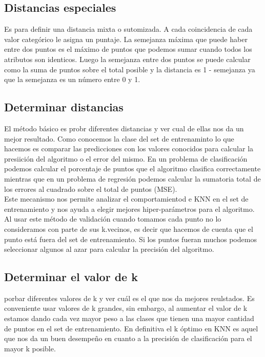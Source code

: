 \documentclass[titlepage,a4paper]{article}
\begin{document}
\subsection*{Distancias especiales}
Es para definir una distancia mixta o sutomizada. A cada coincidencia de cada valor categórico le asigna un puntaje. La semejanza máxima que puede haber entre dos puntos es el máximo de puntos que podemos sumar cuando todos los atributos son identicos. Luego la semejanza entre dos puntos se puede calcular como la suma de puntos sobre el total posible y la distancia es 1 - semejanza ya que la semejanza es un número entre 0 y 1. \\

\subsection*{Determinar distancias}
El método básico es probr diferentes distancias y ver cual de ellas nos da un mejor resultado. Como conocemos la clase del set de entrenaminto lo que hacemos es comparar las predicciones con los valores conocidos para calcular la presiición del algoritmo o el error del mismo. En un problema de clasificación podemos calcular el  porcentaje de puntos que el algoritmo clasifica correctamente mientras que en un problema de regresión podemos calcular la sumatoria total de los errores al cuadrado sobre el total de puntos (MSE). \\

Este mecanismo nos permite analizar el comportamientod e KNN en el set de entrenamiento y nos ayuda a elegir mejores hiper-parámetros para el algoritmo. Al usar este método de validación cuando tomamos cada punto no lo consideramos con parte de sus k.vecinos, es decir que hacemos de cuenta que el punto está fuera del set de entrenamiento. Si los puntos fueran muchos podemos seleccionar algunos al azar para calcular la precisión del algoritmo. \\

\subsection*{Determinar el valor de k} 
porbar diferentes valores de k y ver cuál es el que nos da mejores reulstados. Es conveniente usar valores de k grandes, sin embargo, al aumentar el valor de k estamos dando cada vez mayor peso a las clases que tienen una mayor cantidad de puntos en el set de entrenamiento. En definitiva el k óptimo en KNN es aquel que nos da un buen desempeño en cuanto a la precisión de clasificación para el mayor k posible. \\
\end{document}
